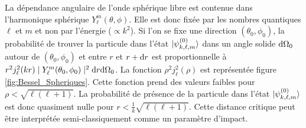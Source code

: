 La dépendance angulaire de l'onde sphérique libre est contenue dans l'harmonique sphérique $Y_{\ell}^{m}(\theta, \phi)$. Elle est donc fixée par les nombres quantiques $\ell$ et $m$ et non par l'énergie ($\propto k^2$). Si l'on se fixe une direction $(\theta_0,\phi_0)$, la probabilité de trouver la particule dans l'état $\ket{\psi^{(0)}_{k,\ell,m}}$ dans un angle solide $\mathrm{d}\Omega_0$ autour de $(\theta_0,\phi_0)$ et entre $r$ et $r+\mathrm{d} r$ est proportionnelle à  
$r^2 j_\ell^2 (kr) \mid Y_{\ell}^{m}(\theta_0, \phi_0) \mid ^2 \mathrm{d} r \mathrm{d} \Omega_0 $. La fonction $\rho^2 j_\ell^2(\rho)$ est représentée figure \ref{fig:Bessel_Spheriques}. Cette fonction prend des valeurs faibles pour $\rho < \sqrt{\ell(\ell+1)}$. La probabilité de présence de la particule dans l'état $\ket{\psi^{(0)}_{k,\ell,m}}$ est donc quasiment nulle pour $r < \frac{1}{k} \sqrt{\ell(\ell+1)}$. Cette distance critique peut être interprétée semi-classiquement comme un paramètre d'impact.

